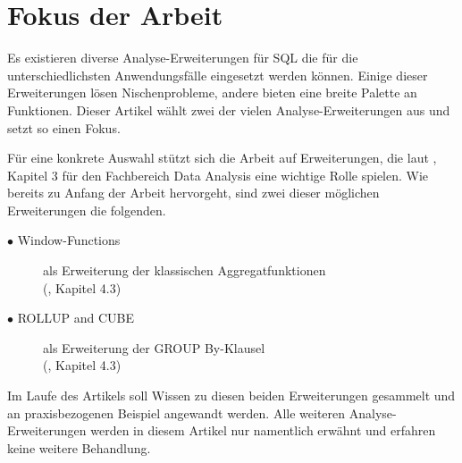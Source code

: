 \section{Fokus der Arbeit}
Es existieren diverse Analyse-Erweiterungen für SQL die für die unterschiedlichsten
Anwendungsfälle eingesetzt werden können. Einige dieser Erweiterungen lösen
Nischenprobleme, andere bieten eine breite Palette an Funktionen. Dieser Artikel
wählt zwei der vielen Analyse-Erweiterungen aus und setzt so einen Fokus.

Für eine konkrete Auswahl stützt sich die Arbeit auf Erweiterungen, die laut \citet{FOTACHE2015243},
Kapitel 3 für den Fachbereich Data Analysis eine wichtige Rolle spielen. Wie
bereits zu Anfang der Arbeit hervorgeht, sind zwei dieser möglichen Erweiterungen
die folgenden.
\begin{description}
	\item[$\bullet$ Window-Functions] als Erweiterung der klassischen Aggregatfunktionen
		\\ (\cite{FOTACHE2015243}, Kapitel 4.3)

	\item[$\bullet$ ROLLUP and CUBE] als Erweiterung der GROUP By-Klausel \\ (\cite{FOTACHE2015243},
		Kapitel 4.3)
\end{description}
Im Laufe des Artikels soll Wissen zu diesen beiden Erweiterungen gesammelt und
an praxisbezogenen Beispiel angewandt werden. Alle weiteren Analyse-Erweiterungen
werden in diesem Artikel nur namentlich erwähnt und erfahren keine weitere Behandlung.